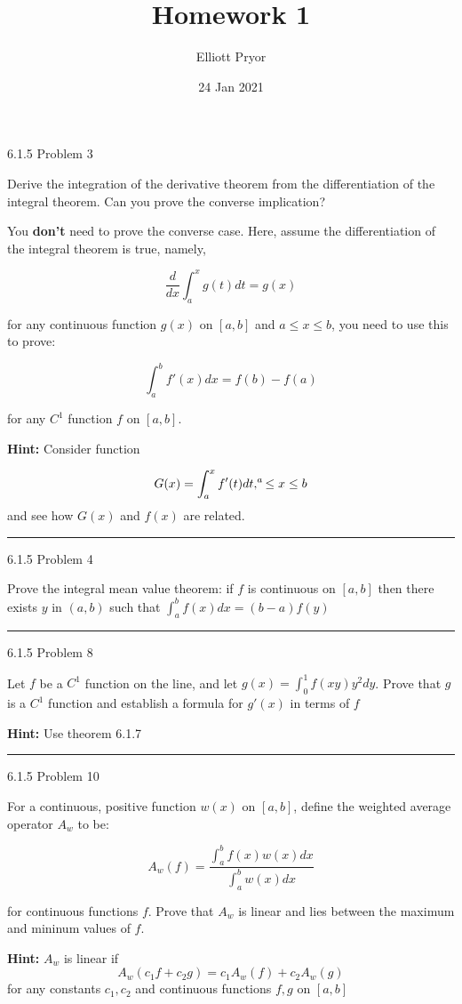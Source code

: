 \documentclass[11pt]{article}
\title{Homework 1}
\author{Elliott Pryor}
\date{24 Jan 2021}
\begin{document}
\maketitle

 6.1.5 Problem 3

Derive the integration of the derivative theorem from the differentiation of 
the integral theorem. Can you prove the converse implication?

You \textbf{don't} need to prove the converse case. Here, assume the differentiation of the integral
theorem is true, namely,

$$\frac{d}{dx} \int_a ^x g(t) dt = g(x)$$ 

for any continuous function $g(x)$ on $[a,b]$ and $a \leq x \leq b$, you need to use this to prove:

$$\int_a ^b f'(x) dx = f(b) - f(a)$$

for any $C^1$ function $f$ on $[a,b]$.

\textbf{Hint:} Consider function

$$G(x) = \int_a ^x f'(t)dt, \sp a \leq x \leq b$$
and see how $G(x)$ and $f(x)$ are related.
\hrule






 6.1.5 Problem 4

Prove the integral mean value theorem: if $f$ is continuous on $[a,b]$ then there exists $y$ in $(a,b)$ 
such that $\int_a ^b f(x) dx = (b - a)f(y)$
\hrule








 6.1.5 Problem 8

Let $f$ be a $C^1$ function on the line, and let $g(x) = \int_0 ^1 f(xy)y^2 dy$.
Prove that $g$ is a $C^1$ function and establish a formula for $g'(x)$ in terms of $f$

\textbf{Hint:} Use theorem 6.1.7
\hrule





 6.1.5 Problem 10

For a continuous, positive function $w(x)$ on $[a,b]$, define the weighted average operator $A_w$ to be:

$$A_w(f) = \frac{ \int_a ^b f(x) w(x) dx }{ \int_a ^b w(x) dx}$$

for continuous functions $f$. Prove that $A_w$ is linear and lies between the maximum and mininum values of $f$.

\textbf{Hint:} $A_w$ is linear if
$$A_w (c_1 f + c_2 g) = c_1 A_w (f) + c_2 A_w (g)$$
for any constants $c_1, c_2$ and continuous functions $f,g$ on $[a,b]$
\end{document}
